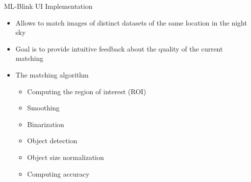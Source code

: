 \begin{frame}{ML-Blink UI Implementation}
    \begin{itemize}
        \item Allows to match images of distinct datasets of the same location in the night sky
        \item Goal is to provide intuitive feedback about the quality of the current matching 
        \item The matching algorithm
            \begin{itemize}
                \item Computing the region of interest (ROI)
                \item Smoothing
                \item Binarization
                \item Object detection
                \item Object size normalization
                \item Computing accuracy
            \end{itemize}
    \end{itemize}
\end{frame}

